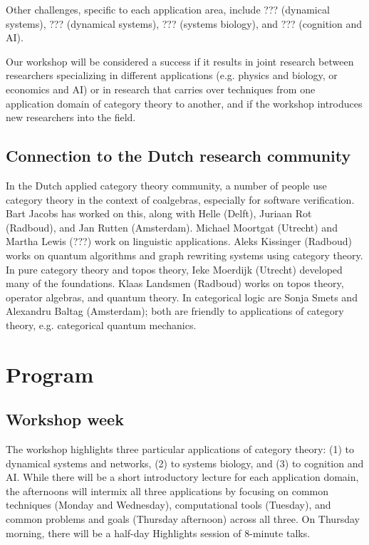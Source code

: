 \documentclass{article}
\newcommand{\redout}[1]{{\color{red}#1}}
\begin{document}
Other challenges, specific to each application area, include \redout{???} (dynamical systems), \redout{???} (dynamical systems), \redout{???} (systems biology), and \redout{???} (cognition and AI).

Our workshop will be considered a success if it results in joint research between researchers specializing in different applications (e.g. physics and biology, or economics and AI) or in research that carries over techniques from one application domain of category theory to another, and if the workshop introduces new researchers into the field.

\subsection{Connection to the Dutch research community}
In the Dutch applied category theory community, a number of people use category theory  in the context of coalgebras, especially for software verification. Bart Jacobs has worked on this, along with Helle (Delft), Juriaan Rot (Radboud), and Jan Rutten (Amsterdam). Michael Moortgat (Utrecht) and \redout{Martha Lewis (???)} work on linguistic applications. Aleks Kissinger (Radboud) works on quantum algorithms and graph rewriting systems using category theory. In pure category theory and topos theory, Ieke Moerdijk (Utrecht) developed many of the foundations. Klaas Landsmen (Radboud) works on topos theory, operator algebras, and quantum theory. In categorical logic are Sonja Smets and Alexandru Baltag (Amsterdam); both are friendly to applications of category theory, e.g. categorical quantum mechanics.

\section{Program}
\subsection{Workshop week}
The workshop highlights three particular applications of category theory: (1) to dynamical systems and networks, (2) to systems biology, and (3) to cognition and AI. While there will be a short introductory lecture for each application domain, the afternoons will intermix all three applications by focusing on common techniques (Monday and Wednesday), computational tools (Tuesday), and common problems and goals (Thursday afternoon) across all three. On Thursday morning, there will be a half-day Highlights session of 8-minute talks.
\end{document}

